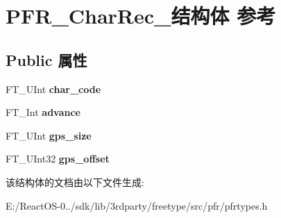 \hypertarget{struct_p_f_r___char_rec__}{}\section{P\+F\+R\+\_\+\+Char\+Rec\+\_\+结构体 参考}
\label{struct_p_f_r___char_rec__}
\subsection*{Public 属性}
\begin{DoxyCompactItemize}
\item 
\mbox{\label{struct_p_f_r___char_rec___a2b71d5f6a2b9e40883ec5e471bb056c6}} 
F\+T\+\_\+\+U\+Int {\bfseries char\+\_\+code}
\item 
\mbox{\label{struct_p_f_r___char_rec___a8078980b8602d36de6cf445304fa5d99}} 
F\+T\+\_\+\+Int {\bfseries advance}
\item 
\mbox{\label{struct_p_f_r___char_rec___a96bc9b0057e0add10f9a8848e6619043}} 
F\+T\+\_\+\+U\+Int {\bfseries gps\+\_\+size}
\item 
\mbox{\label{struct_p_f_r___char_rec___a04b41b0f46e9a810da05280e3e75cee1}} 
F\+T\+\_\+\+U\+Int32 {\bfseries gps\+\_\+offset}
\end{DoxyCompactItemize}


该结构体的文档由以下文件生成\+:\begin{DoxyCompactItemize}
\item 
E\+:/\+React\+O\+S-\/0../sdk/lib/3rdparty/freetype/src/pfr/pfrtypes.\+h\end{DoxyCompactItemize}
